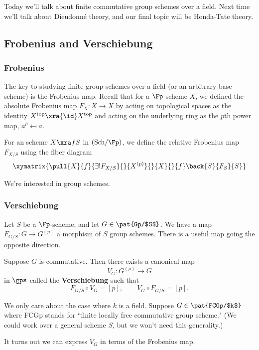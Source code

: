 
Today we'll talk about finite commutative group schemes over a field. Next time we'll talk about Dieudonn\'e theory, and our final topic will be Honda-Tate theory. %

\subsection{Frobenius and Verschiebung}
\subsubsection{Frobenius}
The key to studying finite group schemes over a field (or an arbitrary base scheme) is the Frobenius map. Recall that for a $\Fp$-scheme $X$, we defined the absolute Frobenius map $F_X:X\to X$ by acting on topological spaces as the identity $X^{\text{top}}\xra{\id}X^{\text{top}}$ and acting on the underlying ring as the $p$th power map, $a^p\mapsfrom a$. 

For an scheme $X\xra fS$ in $(\text{Sch}/\Fp)$, we define the relative Frobenius map $F_{X/S}$ using the fiber diagram
\[
\xymatrix{
\pull{X}{f}{\exists ! F_{X/S}}{}{X^{(p)}}{}{X}{}{f}\back{S}{F_S}{S}
}
\]

We're interested in group schemes. 
%
\subsubsection{Verschiebung}

Let $S$ be a $\Fp$-scheme, and let $G\in  \pat{Gp/$S$}$. We have a map $F_{G/S}:G\to G^{(p)}$ a morphism of $S$ group schemes. There is a useful map going the opposite direction. %

\begin{fct}
Suppose $G$ is commutative. Then there exists a canonical map 
\[
V_G:G^{(p)}\to G
\]
in $\gps$ called the \textbf{Verschiebung} such that
\[
F_{G/S}\circ V_G=[p],\qquad V_G\circ F_{G/S}=[p].
\]
\end{fct}

We only care about the case where $k$ is a field. Suppose $G\in \pat{FCGp/$k$}$ where FCGp stands for ``finite locally free commutative group scheme." (We could work over a general scheme $S$, but we won't need this generality.)

It turns out we can express $V_G$ in terms of the Frobenius map.

